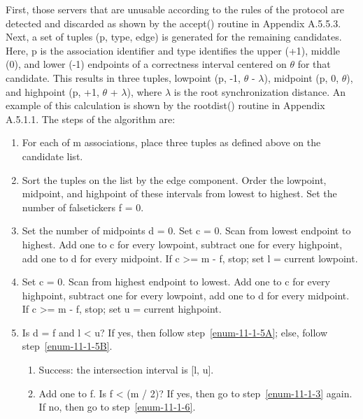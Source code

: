 First, those servers that are unusable according to the rules of the
protocol are detected and discarded as shown by the accept() routine
in Appendix A.5.5.3. Next, a set of tuples (p, type, edge) is
generated for the remaining candidates. Here, p is the association
identifier and type identifies the upper (+1), middle (0), and lower
(-1) endpoints of a correctness interval centered on $ \theta $ for that
candidate. This results in three tuples, lowpoint (p, -1, $ \theta $ -
$ \lambda $), midpoint (p, 0, $ \theta $), and highpoint (p, +1, $ \theta $ +
$ \lambda $), where $ \lambda $ is the root synchronization distance. An
example of this calculation is shown by the rootdist() routine in
Appendix A.5.1.1. The steps of the algorithm are:

\begin{enumerate}
  \item For each of m associations, place three tuples as defined above
    on the candidate list.

  \item Sort the tuples on the list by the edge component. Order the
    lowpoint, midpoint, and highpoint of these intervals from lowest to
    highest. Set the number of falsetickers f = 0.

  \item \label{enum-11-1-3} Set the number of midpoints d = 0. Set c = 0. Scan from lowest
    endpoint to highest. Add one to c for every lowpoint, subtract one
    for every highpoint, add one to d for every midpoint. If c >= m - f,
    stop; set l = current lowpoint.

  \item Set c = 0. Scan from highest endpoint to lowest. Add one to c
    for every highpoint, subtract one for every lowpoint, add one to d
    for every midpoint. If c >= m - f, stop; set u = current highpoint.

  \item \label{enum-11-1-5} Is d = f and l < u? If yes, then follow step~\ref{enum-11-1-5A}; else, follow
    step~\ref{enum-11-1-5B}.

    \begin{enumerate}
      \item \label{enum-11-1-5A} Success: the intersection interval is [l, u].

      \item \label{enum-11-1-5B} Add one to f. Is f < (m / 2)? If yes, then go to step~\ref{enum-11-1-3} again.
        If no, then go to step~\ref{enum-11-1-6}.
    \end{enumerate}


\end{enumerate}
